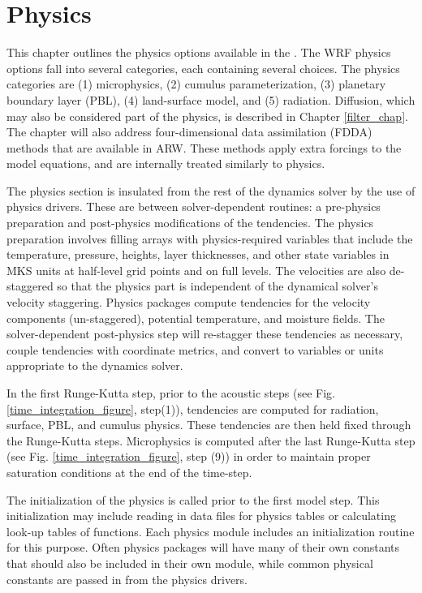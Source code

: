 \chapter{Physics}
\label{physics_chap}

This chapter
outlines the physics options available in the {\wrf}. 
The WRF physics options fall into several categories, each containing
several choices. The physics categories are (1) microphysics, 
(2) cumulus parameterization, (3) planetary boundary layer (PBL), 
(4) land-surface model, and (5) radiation. Diffusion, which
may also be considered part of the physics, 
is described in Chapter \ref{filter_chap}. The chapter will also
address four-dimensional data assimilation (FDDA) methods that are
available in ARW. These methods apply extra forcings to the model
equations, and are internally treated similarly to physics.

The physics section is insulated from the rest of the dynamics solver by the 
use of physics drivers. These are between solver-dependent routines: a 
pre-physics preparation and post-physics 
modifications of the tendencies. The physics preparation involves filling
arrays with physics-required variables that include the temperature,
pressure, heights, layer thicknesses,
and other state variables in MKS units at half-level grid points and on full levels.
The velocities are also de-staggered so that the physics part is independent
of the dynamical solver's velocity staggering. Physics packages 
compute tendencies
for the velocity components (un-staggered), potential temperature, and moisture
fields. The solver-dependent post-physics step will re-stagger these tendencies
as necessary, couple tendencies with coordinate metrics, and convert
to variables or units appropriate to the dynamics solver.

In the first Runge-Kutta step, prior to the acoustic steps (see Fig.
\ref{time_integration_figure}, step(1)), tendencies are computed for
radiation, surface, PBL, and cumulus physics. These tendencies
are then held fixed through the Runge-Kutta steps. Microphysics is
computed after the last Runge-Kutta step 
(see Fig. \ref{time_integration_figure},
step (9)) in order to maintain proper saturation conditions at the end 
of the time-step.

The initialization of the physics is
called prior to the first model step. This initialization may include reading
in data files for physics tables or calculating look-up tables of functions.
Each physics module includes an initialization routine for this purpose.
Often physics packages will have many of their own constants that should also
be included in their own module, while common physical constants are
passed in from the physics drivers.


